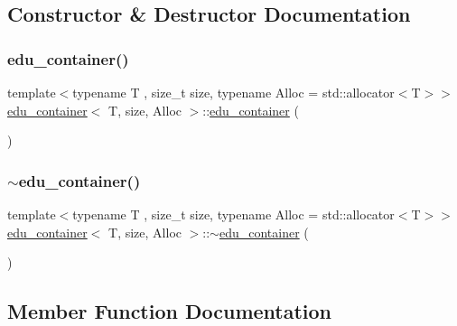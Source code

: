 \subsection{Constructor \& Destructor Documentation}
\mbox{\label{classedu__container_a4facfaba4cbdd4b8845e05f7b29dfc46}} 
\subsubsection{\texorpdfstring{edu\+\_\+container()}{edu\_container()}}
{\footnotesize\ttfamily template$<$typename T , size\+\_\+t size, typename Alloc  = std\+::allocator$<$\+T$>$$>$ \\
\hyperlink{classedu__container}{edu\+\_\+container}$<$ T, size, Alloc $>$\+::\hyperlink{classedu__container}{edu\+\_\+container} (\begin{DoxyParamCaption}{ }\end{DoxyParamCaption})\hspace{0.3cm}{\ttfamily [inline]}}

\mbox{\label{classedu__container_a350dad874b99e47a93b074a49841ccf1}} 
\subsubsection{\texorpdfstring{$\sim$edu\+\_\+container()}{~edu\_container()}}
{\footnotesize\ttfamily template$<$typename T , size\+\_\+t size, typename Alloc  = std\+::allocator$<$\+T$>$$>$ \\
\hyperlink{classedu__container}{edu\+\_\+container}$<$ T, size, Alloc $>$\+::$\sim$\hyperlink{classedu__container}{edu\+\_\+container} (\begin{DoxyParamCaption}{ }\end{DoxyParamCaption})\hspace{0.3cm}{\ttfamily [inline]}}



\subsection{Member Function Documentation}
\mbox{\label{classedu__container_a7b97b3fa13a5bb3357062687bd408f7b}} 
